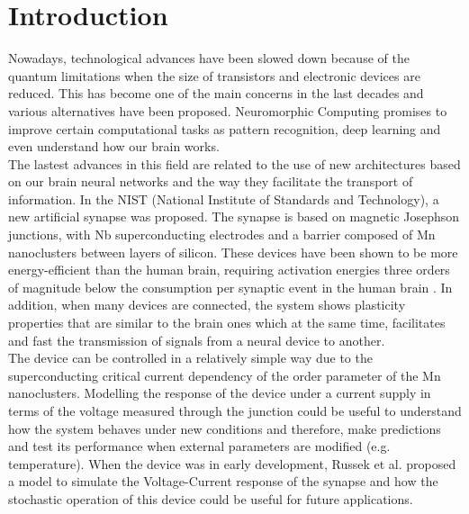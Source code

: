 \documentclass[12pt]{article}
\begin{document}
\hspace{0pt}
\pagebreak
\clearpage
\tableofcontents
\clearpage


\section{Introduction}

Nowadays, technological advances have been slowed down because of the quantum limitations when the size of transistors and electronic devices are reduced. This has become one of the main concerns in the last decades and various alternatives have been proposed. Neuromorphic Computing promises to improve certain computational tasks as pattern recognition, deep learning and even understand how our brain works.\\

The lastest advances in this field are related to the use of new architectures based on our brain neural networks and the way they facilitate the transport of information. In the NIST (National Institute of Standards and Technology), a new artificial synapse was proposed. The synapse is based on magnetic Josephson junctions, with Nb superconducting electrodes and a barrier composed of Mn nanoclusters between layers of silicon. These devices have been shown to be more energy-efficient than the human brain, requiring activation energies three orders of magnitude below the consumption per synaptic event in the human brain \cite{MAINREF}. In addition, when many devices are connected, the system shows plasticity properties that are similar to the brain ones which at the same time, facilitates and fast the transmission of signals from a neural device to another.\\

The device can be controlled in a relatively simple way due to the superconducting critical current dependency of the order parameter of the Mn nanoclusters. Modelling the response of the device under a current supply in terms of the voltage measured through the junction could be useful to understand how the system behaves under new conditions and therefore, make predictions and test its performance when external parameters are modified (e.g. temperature). When the device was in early development, Russek et al. \cite{RUSSEK} proposed a model to simulate the Voltage-Current response of the synapse and how the stochastic operation of this device could be useful for future applications. \\
\end{document}
